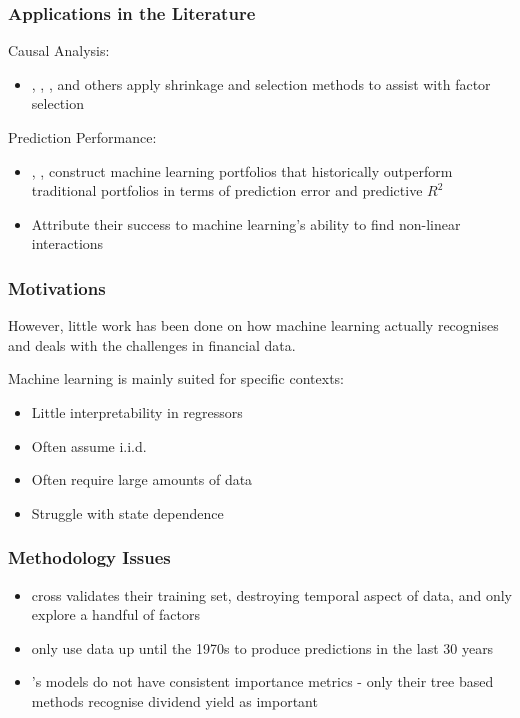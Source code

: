 \documentclass[aspectratio=169]{beamer}
\begin{document}
\begin{frame}
\frametitle{Applications in the Literature}
Causal Analysis:
\begin{itemize}
	\item \cite{kozak_shrinking_2017}, \cite{rapach_forecasting_2013}, \cite{freyberger_dissecting_2017}, and others apply shrinkage and selection methods to assist with factor selection
\end{itemize}
Prediction Performance:
\begin{itemize}
	\item \cite{gu_empirical_2018}, \cite{feng_deep_2018}, construct machine learning portfolios that historically outperform traditional portfolios in terms of prediction error and predictive $R^2$
	\item Attribute their success to machine learning's ability to find non-linear interactions
\end{itemize}
\end{frame}

\begin{frame}
\frametitle{Motivations}
However, little work has been done on how machine learning actually recognises and deals with the challenges in financial data. 

Machine learning is mainly suited for specific contexts:
\begin{itemize}
	\item Little interpretability in regressors
	\item Often assume i.i.d.
	\item Often require large amounts of data
	\item Struggle with state dependence
\end{itemize}
\end{frame}

\begin{frame}
\frametitle{Methodology Issues}
\begin{itemize}
	\item \cite{feng_deep_2018} cross validates their training set, destroying temporal aspect of data, and only explore a handful of factors
	\item \cite{gu_empirical_2018} only use data up until the 1970s to produce predictions in the last 30 years
	\item \cite{gu_empirical_2018}'s models do not have consistent importance metrics - only their tree based methods recognise dividend yield as important
\end{itemize}
\end{frame}
\end{document}
